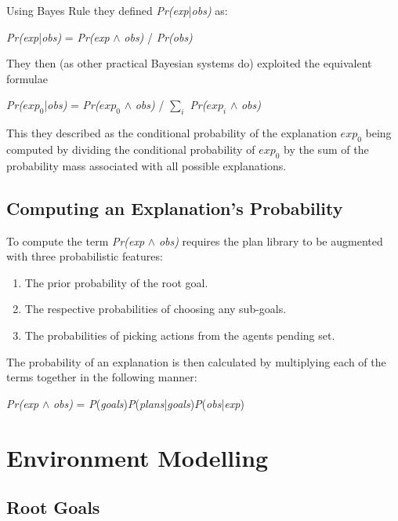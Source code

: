\documentclass[parskip]{cs4rep}
\begin{document}
Using Bayes Rule they defined \textit{Pr(exp}|\textit{obs)} as:\newline

\centerline{
\textit{Pr(exp}|\textit{obs)} = \textit{Pr(exp} $\wedge$ \textit{obs)} / \textit{Pr(obs)}
}

They then (as other practical Bayesian systems do) exploited the equivalent formulae\newline

\centerline{
\textit{Pr($exp_0$}|\textit{obs)} = \textit{Pr($exp_0$} $\wedge$ \textit{obs)} / $\displaystyle\sum\nolimits_{i}$ \textit{Pr($exp_i$} $\wedge$ \textit{obs)}
}

This they described as the conditional probability of the explanation $exp_0$ being computed by dividing the conditional probability of $exp_0$  by the sum of the probability mass associated with all possible explanations.

\subsection{Computing an Explanation's Probability}

To compute the term \textit{Pr(exp} $\wedge$ \textit{obs)} requires the plan library to be augmented with three probabilistic features:\newline

\begin{enumerate}
\item
The prior probability of the root goal.
\item
The respective probabilities of choosing any sub-goals.
\item
The probabilities of picking actions from the agents pending set.\newline
\end{enumerate}

The probability of an explanation is then calculated by multiplying each of the terms together in the following manner: \newline

\centerline{
\textit{Pr(exp} $\wedge$ \textit{obs)} = \textit{P}(\textit{goals})\textit{P}(\textit{plans}|\textit{goals})\textit{P}(\textit{obs}|\textit{exp})
}

\section{Environment Modelling}

\subsection{Root Goals}
\end{document}
